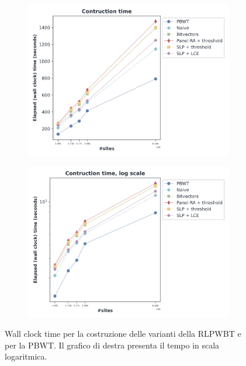 \begin{figure}
  \centering
  \begin{subfigure}{.5\textwidth}
    \centering
    \includegraphics[width=\linewidth]{img/make_time.png}
  \end{subfigure}%
  \begin{subfigure}{.5\textwidth}
    \centering
    \includegraphics[width=\linewidth]{img/make_time_log.png}
  \end{subfigure}
  \caption{Wall clock time per la costruzione delle varianti della RLPWBT e per
    la PBWT. Il grafico di destra presenta il tempo in scala logaritmica.}
  \label{fig:maketimechr}
\end{figure}
